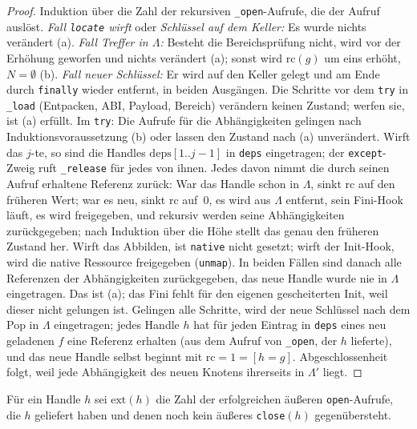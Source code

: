 \begin{proof}
	Induktion über die Zahl der rekursiven \texttt{\_open}-Aufrufe, die der Aufruf auslöst. \emph{Fall \texttt{locate} wirft} oder \emph{Schlüssel auf dem Keller:} Es wurde nichts verändert (a). \emph{Fall Treffer in $\Lambda$:} Besteht die Bereichsprüfung nicht, wird vor der Erhöhung geworfen und nichts verändert (a); sonst wird $\mathrm{rc}(g)$ um eins erhöht, $N=\emptyset$ (b). \emph{Fall neuer Schlüssel:} Er wird auf den Keller gelegt und am Ende durch \texttt{finally} wieder entfernt, in beiden Ausgängen. Die Schritte vor dem \texttt{try} in \texttt{\_load} (Entpacken, ABI, Payload, Bereich) verändern keinen Zustand; werfen sie, ist (a) erfüllt. Im \texttt{try}: Die Aufrufe für die Abhängigkeiten gelingen nach Induktionsvoraussetzung (b) oder lassen den Zustand nach (a) unverändert. Wirft das $j$-te, so sind die Handles $\mathrm{deps}[1..j-1]$ in \texttt{deps} eingetragen; der \texttt{except}-Zweig ruft \texttt{\_release} für jedes von ihnen. Jedes davon nimmt die durch seinen Aufruf erhaltene Referenz zurück: War das Handle schon in $\Lambda$, sinkt $\mathrm{rc}$ auf den früheren Wert; war es neu, sinkt $\mathrm{rc}$ auf~$0$, es wird aus $\Lambda$ entfernt, sein Fini-Hook läuft, es wird freigegeben, und rekursiv werden seine Abhängigkeiten zurückgegeben; nach Induktion über die Höhe stellt das genau den früheren Zustand her. Wirft das Abbilden, ist \texttt{native} nicht gesetzt; wirft der Init-Hook, wird die native Ressource freigegeben (\texttt{unmap}). In beiden Fällen sind danach alle Referenzen der Abhängigkeiten zurückgegeben, das neue Handle wurde nie in $\Lambda$ eingetragen. Das ist (a); das Fini fehlt für den eigenen gescheiterten Init, weil dieser nicht gelungen ist. Gelingen alle Schritte, wird der neue Schlüssel nach dem Pop in $\Lambda$ eingetragen; jedes Handle $h$ hat für jeden Eintrag in \texttt{deps} eines neu geladenen $f$ eine Referenz erhalten (aus dem Aufruf von \texttt{\_open}, der $h$ lieferte), und das neue Handle selbst beginnt mit $\mathrm{rc}=1=[h=g]$. Abgeschlossenheit folgt, weil jede Abhängigkeit des neuen Knotens ihrerseits in $\Lambda'$ liegt.
\end{proof}

\begin{definition}
	Für ein Handle $h$ sei $\mathrm{ext}(h)$ die Zahl der erfolgreichen äußeren \texttt{open}-Aufrufe, die $h$ geliefert haben und denen noch kein äußeres \texttt{close}$(h)$ gegenübersteht.
\end{definition}

